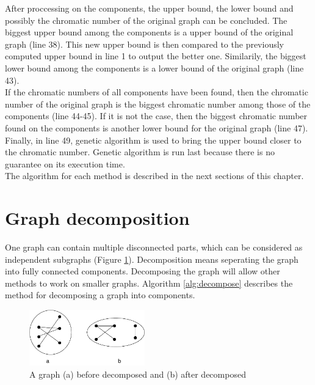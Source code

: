\documentclass[a4paper]{report}
\begin{document}
	After proccessing on the components, the upper bound, the lower bound and possibly the chromatic number of the original graph can be concluded. The biggest upper bound among the components is a upper bound of the original graph (line 38). This new upper bound is then compared to the previously computed upper bound in line 1 to output the better one. Similarily, the biggest lower bound among the components is a lower bound of the original graph (line 43). \\
	If the chromatic numbers of all components have been found, then the chromatic number of the original graph is the biggest chromatic number among those of the components (line 44-45). If it is not the case, then the biggest chromatic number found on the components is another lower bound for the original graph (line 47).\\
	Finally, in line 49, genetic algorithm is used to bring the upper bound closer to the chromatic number. Genetic algorithm is run last because there is no guarantee on its execution time.\\
	
	The algorithm for each method is described in the next sections of this chapter.
	

		\section{Graph decomposition}
		One graph can contain multiple disconnected parts, which can be considered as independent subgraphs (Figure \ref{fig:decompose}). Decomposition means seperating the graph into fully connected components. Decomposing the graph will allow other methods to work on smaller graphs. Algorithm \ref{alg:decompose} describes the method for decomposing a graph into components.\\
		
		\begin{figure}[h]
			\centering
			\includegraphics[width=50mm,scale=0.5]{figures/DecomposedGraph.pdf}
			\caption{A graph (a) before decomposed and (b) after decomposed}
			\label{fig:decompose}
		\end{figure}
	
\end{document}
